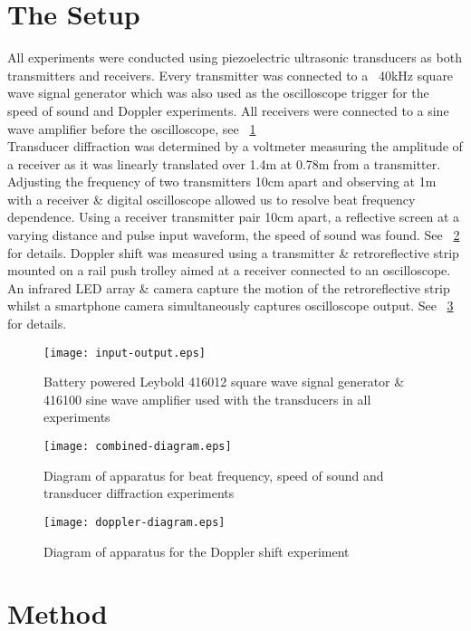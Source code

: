 \documentclass[a4paper,10pt,journal]{IEEEtran}
\newcommand{\figref}[2][\figurename~]{#1\ref{#2}}
\begin{document}
\section{The Setup}
All experiments were conducted using piezoelectric ultrasonic transducers as both transmitters and receivers. Every transmitter was connected to a ~40kHz square wave signal generator which was also used as the oscilloscope trigger for the speed of sound and Doppler experiments. All receivers were connected to a sine wave amplifier before the oscilloscope, see \figref{input-output}\\
Transducer diffraction was determined by a voltmeter measuring the amplitude of a receiver as it was linearly translated over 1.4m at 0.78m from a transmitter. Adjusting the frequency of two transmitters 10cm apart and observing at 1m with a receiver \& digital oscilloscope allowed us to resolve beat frequency dependence. Using a receiver transmitter pair 10cm apart, a reflective screen at a varying distance and pulse input waveform, the speed of sound was found. See \figref{combined-diagram} for details.
Doppler shift was measured using a transmitter \& retroreflective strip mounted on a rail push trolley aimed at a receiver connected to an oscilloscope. An infrared LED array \& camera capture the motion of the retroreflective strip whilst a smartphone camera simultaneously captures oscilloscope output. See \figref{doppler-diagram} for details.

\begin{figure}
	\centering
	\texttt{[image: input-output.eps]}
	\caption{Battery powered Leybold 416012 square wave signal generator \& 416100 sine wave amplifier \cite{echo-sounder-principles} used with the transducers in all experiments}
	\label{input-output}
\end{figure}

\begin{figure}
	\centering
	\texttt{[image: combined-diagram.eps]}
	\caption{Diagram of apparatus for beat frequency, speed of sound and transducer diffraction experiments}
	\label{combined-diagram}
\end{figure}

\begin{figure}
	\centering
	\texttt{[image: doppler-diagram.eps]}
	\caption{Diagram of apparatus for the Doppler shift experiment}
	\label{doppler-diagram}
\end{figure}


\section{Method}
\end{document}
